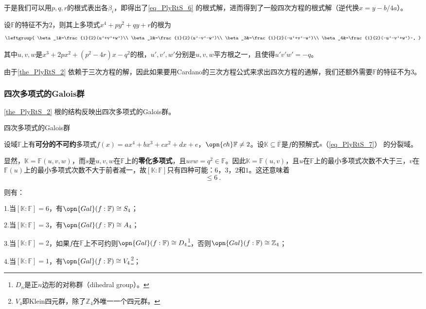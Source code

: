 于是我们可以用$p, q, r$的根式表出各$\beta_i$，即得出了\autoref{eq_PlyRtS_6} 的根式解，进而得到了一般四次方程的根式解（逆代换$x=y-b/4a$）。

\begin{theorem}{}\label{the_PlyRtS_2}

设$\mathbb{F}$的特征不为$2$，则其上多项式$x^4+py^2+qy+r$的根为
\begin{equation}
\leftgroup{
    \beta_1&=\frac{1}{2}(u'+v'+w')\\
    \beta_2&=\frac{1}{2}(u'-v'-w')\\
    \beta_3&=\frac{1}{2}(-u'+v'-w')\\
    \beta_4&=\frac{1}{2}(-u'-v'+w')~,
}
\end{equation}

其中$u, v, w$是$x^3+2px^2+(p^2-4r)x-q^2$的根，$u', v', w'$分别是$u, v, w$平方根之一，且使得$u'v'w'=-q$。

\end{theorem}

由于\autoref{the_PlyRtS_2} 依赖于三次方程的解，因此如果要用Cardano的三次方程公式来求出四次方程的通解，我们还额外需要$\mathbb{F}$的特征不为$3$。


\subsubsection{四次多项式的Galois群}


\autoref{the_PlyRtS_2} 根的结构反映出四次多项式的Galois群。

\begin{theorem}{四次多项式的Galois群}\label{the_PlyRtS_3}

设域$\mathbb{F}$上有\textbf{可分的不可约}多项式$f(x)=ax^4+bx^3+cx^2+dx+e$，$\opn{ch}\mathbb{F}\neq 2$。设$\mathbb{K}\subseteq\overline{\mathbb{F}}$是$f$的预解式$s$（\autoref{eq_PlyRtS_7}） 的分裂域。

显然，$\mathbb{K}=\mathbb{F}(u, v, w)$，而$s$是$u, v, w$在$\mathbb{F}$上的\textbf{零化多项式}，且$uvw=q^2\in\mathbb{F}$。因此$\mathbb{K}=\mathbb{F}(u, v)$，且$u$在$\mathbb{F}$上的最小多项式次数不大于三，$v$在$\mathbb{F}(u)$上的最小多项式次数不大于前者减一，故$[\mathbb{K}:\mathbb{F}]$只有四种可能：$6$，$3$，$2$和$1$。这还意味着
\begin{equation}
[\mathbb{K}:\mathbb{F}]\leq 6~.
\end{equation}

则有：

1.当$[\mathbb{K}:\mathbb{F}]=6$，有$\opn{Gal}(f:\mathbb{F})\cong S_4$；

2.当$[\mathbb{K}:\mathbb{F}]=3$，有$\opn{Gal}(f:\mathbb{F})\cong A_4$；

3.当$[\mathbb{K}:\mathbb{F}]=2$，如果$f$在$\mathbb{F}$上不可约则$\opn{Gal}(f:\mathbb{F})\cong D_4$\footnote{$D_n$是正$n$边形的对称群（dihedral group）。}，否则$\opn{Gal}(f:\mathbb{F})\cong \mathbb{Z}_4$；

4.当$[\mathbb{K}:\mathbb{F}]=1$，有$\opn{Gal}(f:\mathbb{F})\cong V_4$\footnote{$V_4$即Klein四元群，除了$\mathbb{Z}_4$外唯一一个四元群。}；

\end{theorem}

